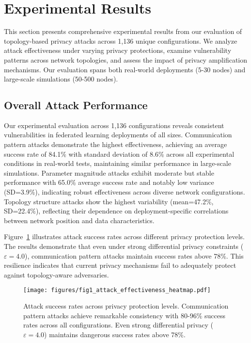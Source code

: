 \section{Experimental Results}
\label{sec:results}

This section presents comprehensive experimental results from our evaluation of topology-based privacy attacks across 1,136 unique configurations. We analyze attack effectiveness under varying privacy protections, examine vulnerability patterns across network topologies, and assess the impact of privacy amplification mechanisms. Our evaluation spans both real-world deployments (5-30 nodes) and large-scale simulations (50-500 nodes).

\subsection{Overall Attack Performance}

Our experimental evaluation across 1,136 configurations reveals consistent vulnerabilities in federated learning deployments of all sizes. Communication pattern attacks demonstrate the highest effectiveness, achieving an average success rate of 84.1\% with standard deviation of 8.6\% across all experimental conditions in real-world tests, maintaining similar performance in large-scale simulations. Parameter magnitude attacks exhibit moderate but stable performance with 65.0\% average success rate and notably low variance (SD=3.9\%), indicating robust effectiveness across diverse network configurations. Topology structure attacks show the highest variability (mean=47.2\%, SD=22.4\%), reflecting their dependence on deployment-specific correlations between network position and data characteristics.

Figure~\ref{fig:attack_effectiveness} illustrates attack success rates across different privacy protection levels. The results demonstrate that even under strong differential privacy constraints ($\varepsilon=4.0$), communication pattern attacks maintain success rates above 78\%. This resilience indicates that current privacy mechanisms fail to adequately protect against topology-aware adversaries.

\begin{figure}[!t]
\centering
\texttt{[image: figures/fig1\_attack\_effectiveness\_heatmap.pdf]}
\caption{Attack success rates across privacy protection levels. Communication pattern attacks achieve remarkable consistency with 80-96\% success rates across all configurations. Even strong differential privacy ($\varepsilon=4.0$) maintains dangerous success rates above 78\%.}
\label{fig:attack_effectiveness}
\end{figure}

